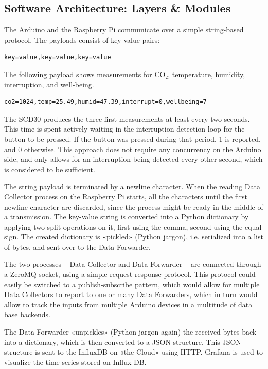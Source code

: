 \subsection{Software Architecture: Layers \& Modules}

The Arduino and the Raspberry Pi communicate over a simple string-based protocol. The payloads consist of key-value pairs:

\begin{verbatim}
key=value,key=value,key=value
\end{verbatim}

The following payload shows measurements for CO₂, temperature, humidity, interruption, and well-being.

\begin{verbatim}
co2=1024,temp=25.49,humid=47.39,interrupt=0,wellbeing=7
\end{verbatim}

The SCD30 produces the three first measurements at least every two seconds. This time is spent actively waiting in the interruption detection loop for the button to be pressed. If the button was pressed during that period, 1 is reported, and 0 otherwise. This approach does not require any concurrency on the Arduino side, and only allows for an interruption being detected every other second, which is considered to be sufficient.

The string payload is terminated by a newline character. When the reading Data Collector process on the Raspberry Pi starts, all the characters until the first newline character are discarded, since the process might be ready in the middle of a transmission. The key-value string is converted into a Python dictionary by applying two split operations on it, first using the comma, second using the equal sign. The created dictionary is «pickled» (Python jargon), i.e. serialized into a list of bytes, and sent over to the Data Forwarder.

The two processes ‒ Data Collector and Data Forwarder ‒ are connected through a ZeroMQ socket, using a simple request-response protocol. This protocol could easily be switched to a publish-subscribe pattern, which would allow for multiple Data Collectors to report to one or many Data Forwarders, which in turn would allow to track the inputs from multiple Arduino devices in a multitude of data base backends.

The Data Forwarder «unpickles» (Python jargon again) the received bytes back into a dictionary, which is then converted to a JSON structure. This JSON structure is sent to the InfluxDB on «the Cloud» using HTTP. Grafana is used to visualize the time series stored on Influx DB.

